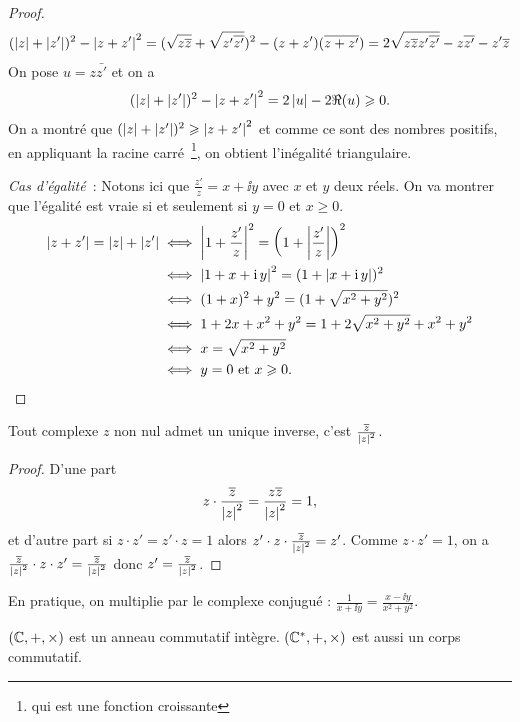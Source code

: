 \begin{proof}
  \begin{equation}
    (\left\lvert z\right\rvert+\left\lvert z'\right\rvert)^2-\left\lvert z+z'\right\rvert^2
    =(\sqrt{z \overline{z}} +\sqrt{z' \overline{z'}})^2 - (z+z')(\overline{z+z'})
    =2 \sqrt{z \overline{z} z' \overline{z'}} - z \overline{z'} - z'\overline{z}
  \end{equation}
  On pose \(u=z \bar{z'}\) et on a
  \begin{equation}
    (\left\lvert z\right\rvert+\left\lvert z'\right\rvert)^2-\left\lvert z+z'\right\rvert^2=2 \left\lvert u\right\rvert-2 \Re(u) \geqslant 0.
  \end{equation}
  On a montré que \((\left\lvert z\right\rvert+\left\lvert z'\right\rvert)^2 \geqslant \left\lvert z+z'\right\rvert^2\) et comme ce sont des nombres positifs, en appliquant la racine carré~\footnote{qui est une fonction croissante}, on obtient l'inégalité triangulaire.

  \emph{Cas d'égalité}~: Notons ici que \(\frac{z'}{z}=x + \ii y\) avec \(x\) et \(y\) deux réels. On va montrer que l'égalité est vraie si et seulement si \(y=0\) et \(x \geqslant 0\).
  \begin{align}
    \left\lvert z+z'\right\rvert=\left\lvert z\right\rvert+\left\lvert z'\right\rvert &\iff \left\lvert1+\frac{z'}{z}\right\rvert^2=\left(1+\left\lvert\frac{z'}{z}\right\rvert\right)^2 \\
    &\iff \left\lvert1+x+\operatorname{i} y\right\rvert^2 = (1+ \left\lvert x+ \operatorname{i} y\right\rvert)^2 \\
    &\iff (1+x)^2+y^2 = (1+\sqrt{x^2+y^2})^2 \\
    &\iff 1+2x+x^2+y^2 = 1 + 2\sqrt{x^2+y^2} + x^2+y^2 \\
    &\iff x = \sqrt{x^2+y^2}\\
    &\iff y=0 \text{~et~} x \geqslant 0.
  \end{align}
\end{proof}
%
\begin{prop}
  Tout complexe \(z\) non nul admet un unique inverse, c'est \(\frac{\overline{z}}{\left\lvert z\right\rvert^2}\).
\end{prop}
\begin{proof}
  D'une part
  \begin{equation}
    z \cdot \frac{\overline{z}}{\left\lvert z\right\rvert^2}=\frac{z \overline{z}}{\left\lvert z\right\rvert^2}=1,
  \end{equation}
  et d'autre part si \(z\cdot z'=z'\cdot z=1\) alors \(z'\cdot z\cdot \frac{\overline{z}}{\left\lvert z\right\rvert^2}=z'\). Comme \(z\cdot z'=1\), on a \( \frac{\overline{z}}{\left\lvert z\right\rvert^2}\cdot z\cdot z'=\frac{\overline{z}}{\left\lvert z\right\rvert^2}\) donc \(z'=\frac{\overline{z}}{\left\lvert z\right\rvert^2}\).
\end{proof}
En pratique, on multiplie par le complexe conjugué : \(\frac{1}{x+\ii y}=\frac{x -\ii y}{x^2+y^2}\).
%
\begin{prop}
  \((\mathbb{C},+,\times)\) est un anneau commutatif intègre. \((\mathbb{C}^*,+,\times)\) est aussi un corps commutatif.
\end{prop}
